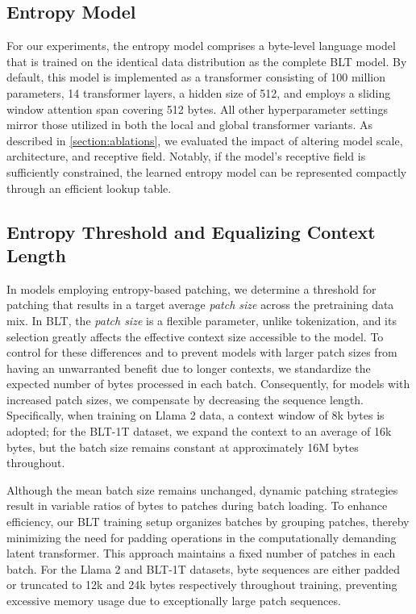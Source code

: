 \subsection{Entropy Model}  
For our experiments, the entropy model comprises a byte-level language model that is trained on the identical data distribution as the complete {\textsc BLT} model. By default, this model is implemented as a transformer consisting of 100 million parameters, 14 transformer layers, a hidden size of 512, and employs a sliding window attention span covering 512 bytes. All other hyperparameter settings mirror those utilized in both the local and global transformer variants. As described in \autoref{section:ablations}, we evaluated the impact of altering model scale, architecture, and receptive field. Notably, if the model's receptive field is sufficiently constrained, the learned entropy model can be represented compactly through an efficient lookup table.

\subsection{Entropy Threshold and Equalizing Context Length} In models employing entropy-based patching, we determine a threshold for patching that results in a target average \textit{patch size} across the pretraining data mix. In {\textsc BLT}, the \textit{patch size} is a flexible parameter, unlike tokenization, and its selection greatly affects the effective context size accessible to the model. To control for these differences and to prevent models with larger patch sizes from having an unwarranted benefit due to longer contexts, we standardize the expected number of bytes processed in each batch. Consequently, for models with increased patch sizes, we compensate by decreasing the sequence length. Specifically, when training on Llama 2 data, a context window of 8k bytes is adopted; for the {\textsc BLT}-1T dataset, we expand the context to an average of 16k bytes, but the batch size remains constant at approximately 16M bytes throughout.

Although the mean batch size remains unchanged, dynamic patching strategies result in variable ratios of bytes to patches during batch loading. To enhance efficiency, our {\textsc BLT} training setup organizes batches by grouping patches, thereby minimizing the need for padding operations in the computationally demanding latent transformer. This approach maintains a fixed number of patches in each batch. For the Llama 2 and {\textsc BLT}-1T datasets, byte sequences are either padded or truncated to 12k and 24k bytes respectively throughout training, preventing excessive memory usage due to exceptionally large patch sequences.

